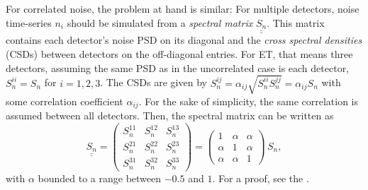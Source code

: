 For correlated noise, the problem at hand is similar: For multiple detectors, noise time-series $n_i$ should be simulated from a \emph{spectral matrix} $\underline{\underline{S_n}}$. This matrix contains each detector's noise PSD on its diagonal and the \emph{cross spectral densities} (CSDs) between detectors on the off-diagonal entries. For ET, that means three detectors, assuming the same PSD as in the uncorrelated case is each detector, $S_n^{ii} = S_n$ for $i=1,2,3$.
The CSDs are given by $S_n^{ij} = \alpha_{ij}\surd{S_n^{ii}S_n^{jj}} = \alpha_{ij} S_n$ with some correlation coefficient $\alpha_{ij}$. For the sake of simplicity, the same correlation is assumed between all detectors. Then, the spectral matrix can be written as
\begin{equation}
	\underline{\underline{S_n}} = \begin{pmatrix}
		S_n^{11} & S_n^{12} & S_n^{13} \\
		S_n^{21} & S_n^{22} & S_n^{23} \\
		S_n^{31} & S_n^{32} & S_n^{33}
	\end{pmatrix} 
	= \begin{pmatrix}
		1 & \alpha & \alpha \\
		\alpha & 1 & \alpha \\
		\alpha & \alpha & 1
	\end{pmatrix}\,S_n,
\end{equation}
with $\alpha$ bounded to a range between $-0.5$ and $1$. %
For a proof, see the \cite{PhysRevD.110.104060}.

